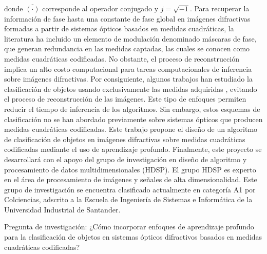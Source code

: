 donde $\overline{(\cdot)}$ corresponde al operador conjugado y $j=\sqrt{-1}$. Para recuperar la información de fase hasta una constante de fase global en imágenes difractivas formadas a partir de sistemas ópticos basados en medidas cuadráticas, la literatura ha incluido un elemento de modulación denominado máscaras de fase, que generan redundancia en las medidas captadas, las cuales se conocen como medidas cuadráticas codificadas. No obstante, el proceso de reconstrucción implica un alto costo computacional para tareas computacionales de inferencia sobre imágenes difractivas. Por consiguiente, algunos trabajos han estudiado la clasificación de objetos usando exclusivamente las medidas adquiridas \cite{bacca2020coupled,douarre2020value,kim2018deep,ziletti2018insightful}, evitando el proceso de reconstrucción de las imágenes. Este tipo de enfoques permiten reducir el tiempo de inferencia de los algoritmos. Sin embargo, estos esquemas de clasificación no se han abordado previamente sobre sistemas ópticos que producen medidas cuadráticas codificadas. Este trabajo propone el diseño de un algoritmo de clasificación de objetos en imágenes difractivas sobre medidas cuadráticas codificadas mediante el uso de aprendizaje profundo. Finalmente, este proyecto se desarrollará con el apoyo del grupo de investigación en diseño de algoritmo y procesamiento de datos multidimensionales (HDSP). El grupo HDSP es experto en el área de procesamiento de imágenes y señales de alta dimensionalidad. Este grupo de investigación se encuentra clasificado actualmente en categoría A1 por Colciencias, adscrito a la Escuela de Ingeniería de Sistemas e Informática de la Universidad Industrial de Santander. 

Pregunta de investigación: ¿Cómo incorporar enfoques de aprendizaje profundo para la clasificación de objetos en sistemas ópticos difractivos basados en medidas cuadráticas codificadas?

\pagebreak